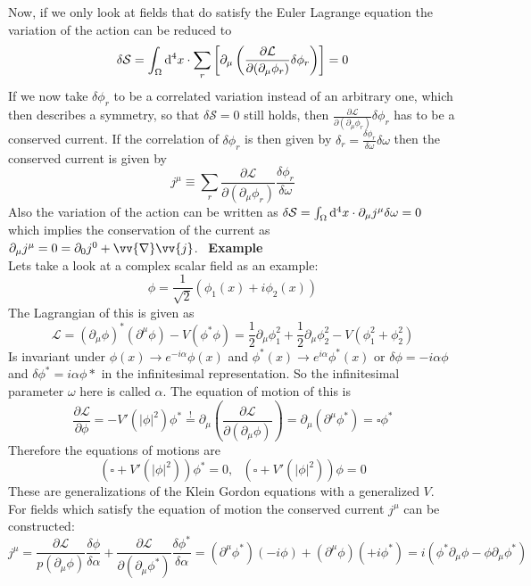 \documentclass{include/thesisclass}
\newcommand{\LL}{\mathcal{L}}
\newcommand{\SSS}{\mathcal{S}}
\newcommand{\cc}{\cdot}
\newcommand{\df}{\rightarrow}
\newcommand{\dd}{{\rm d}}
\newcommand{\p}{\partial}
\newcommand{\soll}{\overset{!}{=}}
\newcommand{\vn}{\vv{\nabla}}
\newcommand{\sub}[1]{~\newline\newline\textbf{#1}\\}
\begin{document}
Now, if we only look at fields that do satisfy the Euler Lagrange equation the variation of the action can be reduced to
\[ \delta \SSS = \int_\Omega \dd ^4 x \cc \sum_r \left[ \p_\mu \left( \frac{\p \LL}{\p( \p_\mu \phi_r)} \delta \phi_r\right)\right] = 0\]
If we now take $\delta \phi_r$ to be a correlated variation instead of an arbitrary one, which then describes a symmetry, so that $\delta \SSS = 0$ still holds, then $\frac{\p \LL}{\p ( \p_\mu \phi_r)} \delta \phi_r$ has to be a conserved current. If the correlation of $\delta \phi_r$ is then given by $\delta_r = \frac{\delta \phi_r}{\delta \omega}\delta \omega$ then the conserved current is given by
\[ j^\mu \equiv \sum_r \frac{\p \LL}{\p ( \p_\mu \phi_r)} \frac{\delta \phi_r}{\delta \omega}\]
Also the variation of the action can be written as $\delta \SSS = \int_\Omega \dd^4 x \cc \p_\mu j^\mu \delta \omega = 0$ which implies the conservation of the current as $\p_\mu j^\mu = 0 = \p_0 j^0 + \vn \vv{j}$.
\sub{Example}
Lets take a look at a complex scalar field as an example:
\[ \phi = \frac{1}{\sqrt{2}} ( \phi_1(x) + i \phi_2(x))\]
The Lagrangian of this is given as
\[ \LL = ( \p_\mu \phi)^*(\p^\mu \phi) - V( \phi^*\phi) = \frac{1}{2} \p_\mu \phi_1^2 + \frac{1}{2} \p_\mu \phi_2^2 - V( \phi_1^2 + \phi_2^2)\]
Is invariant under $\phi(x) \df e^{-i\alpha} \phi(x)$ and $\phi^*(x) \df e^{i\alpha}\phi^*(x)$ or $\delta \phi = - i \alpha \phi$ and $\delta \phi^* = i \alpha \phi*$ in the infinitesimal representation. So the infinitesimal parameter $\omega$ here is called $\alpha$. The equation of motion of this is 
\[ \frac{\p \LL}{\p \phi} = - V'( | \phi|^2) \phi^* \soll \p_\mu \left( \frac{\p \LL}{\p ( \p_\mu \phi)}\right) = \p_\mu ( \p^\mu \phi^*) = \square \phi^*\]
Therefore the equations of motions are
\[ ( \square + V'(| \phi|^2)) \phi^* = 0, ~~~ ( \square + V'(|\phi|^2)) \phi = 0\]
These are generalizations of the Klein Gordon equations with a generalized $V$.\\
For fields which satisfy the equation of motion the conserved current $j^\mu$ can be constructed:
\[ j ^\mu = \frac{\p \LL}{p (\p_\mu \phi)} \frac{\delta \phi}{\delta \alpha} + \frac{\p \LL}{\p(\p_\mu \phi^*)} \frac{\delta \phi^*}{\delta \alpha} = ( \p^\mu \phi^*)(-i \phi) + ( \p^\mu \phi) (+i \phi^*) = i ( \phi^* \p_\mu \phi - \phi \p_\mu \phi^*)\]
\end{document}
